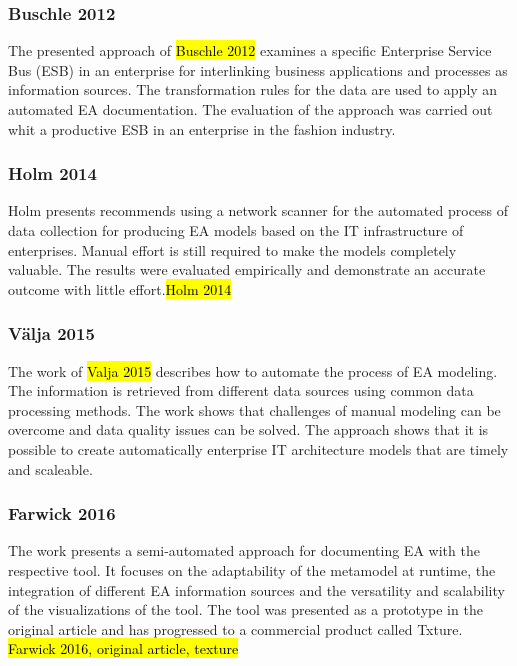 \subsubsection{Buschle  2012}
The presented approach of \hl{Buschle 2012} examines a specific Enterprise Service Bus (ESB) in an enterprise for interlinking business applications and processes as information sources. The transformation rules for the data are used to apply an automated EA documentation. The evaluation of the approach was carried out whit a productive ESB in an enterprise in the fashion industry.

\subsubsection{Holm  2014}
Holm presents recommends using a network scanner for the automated process of data collection for producing EA models based on the IT infrastructure of enterprises. Manual effort is still required to make the models completely valuable. The results were evaluated empirically and demonstrate an accurate outcome with little effort.\hl{Holm 2014}

\subsubsection{Välja 2015}
The work of \hl{Valja 2015} describes how to automate the process of EA modeling. The information is retrieved from different data sources using common data processing methods. The work shows that challenges of manual modeling can be overcome and data quality issues can be solved. The approach shows that it is possible to create automatically enterprise IT architecture models that are timely and scaleable.

\subsubsection{Farwick 2016}
The work presents a semi-automated approach for documenting EA with the respective tool. It focuses on the adaptability of the metamodel at runtime, the integration of different EA information sources and the versatility and scalability of the visualizations of the tool. The tool was presented as a prototype in the original article and has progressed to a commercial product called Txture. \hl{Farwick 2016, original article, texture}

